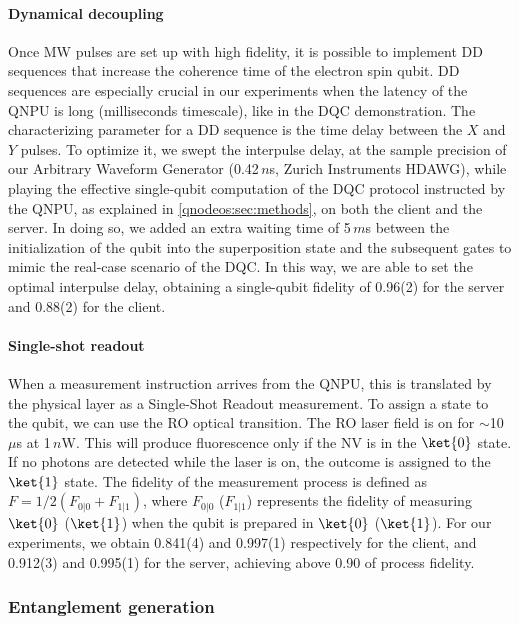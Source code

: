 \paragraph{Dynamical decoupling}

Once \ac{MW} pulses are set up with high fidelity, it is possible to implement \ac{DD} sequences that increase the coherence time of the electron spin qubit. \ac{DD} sequences are especially crucial in our experiments when the latency of the \ac{QNPU} is long (milliseconds timescale), like in the \ac{DQC} demonstration. The characterizing parameter for a \ac{DD} sequence is the time delay between the $X$ and $Y$ pulses. To optimize it, we swept the interpulse delay, at the sample precision of our Arbitrary Waveform Generator (0.42\,$n$s, Zurich Instruments HDAWG), while playing the effective single-qubit computation of the \ac{DQC} protocol instructed by the \ac{QNPU}, as explained in \cref{qnodeos:sec:methods}, on both the client and the server. In doing so, we added an extra waiting time of 5\,$m$s between the initialization of the qubit into the superposition state and the subsequent gates to mimic the real-case scenario of the \ac{DQC}. In this way, we are able to set the optimal interpulse delay, obtaining a single-qubit fidelity of 0.96(2) for the server and 0.88(2) for the client.

\paragraph{Single-shot readout}

When a measurement instruction arrives from the \ac{QNPU}, this is translated by the physical layer as a Single-Shot Readout measurement. To assign a state to the qubit, we can use the \ac{RO} optical transition. The \ac{RO} laser field is on for $\sim$10\,$\mu$s at 1\,$n$W. This will produce fluorescence only if the \ac{NV} is in the $\ket{0}$ state. If no photons are detected while the laser is on, the outcome is assigned to the $\ket{1}$ state. The fidelity of the measurement process is defined as $F=1/2(F_{0|0}+F_{1|1})$, where $F_{0|0}$ ($F_{1|1}$) represents the fidelity of measuring $\ket{0}$ ($\ket{1}$) when the qubit is prepared in $\ket{0}$ ($\ket{1}$). For our experiments, we obtain 0.841(4) and 0.997(1) respectively for the client, and 0.912(3) and 0.995(1) for the server, achieving above 0.90 of process fidelity.

\subsubsection{Entanglement generation}
\label{qnodeos:sec:NVentanglement}

